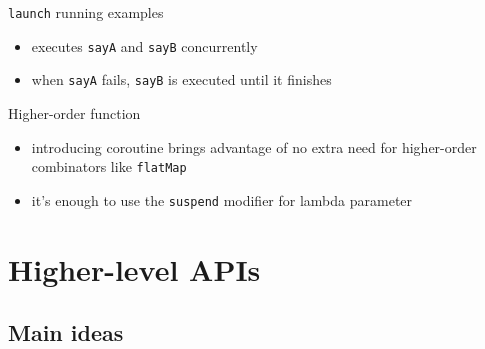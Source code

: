 \documentclass[hyperref={pdfpagelabels=false},xcolor={dvipsnames},compress,onlytextwidth]{beamer}
\begin{document}
    \begin{frame}[fragile]{\texttt{launch} running examples}
        \pause
        \begin{itemize}
            \item executes \texttt{sayA} and \texttt{sayB} concurrently\pause
            \item when \texttt{sayA} fails, \texttt{sayB} is executed until it finishes
        \end{itemize}
    \end{frame}

    \begin{frame}[fragile]{Higher-order function}
        \begin{itemize}
            \item introducing coroutine brings advantage of no extra need for higher-order combinators like \texttt{flatMap}\pause
            \item it's enough to use the \texttt{suspend} modifier for lambda parameter\pause
        \end{itemize}
        
    \end{frame}


    \section{Higher-level APIs}

    \subsection{Main ideas}
\end{document}
